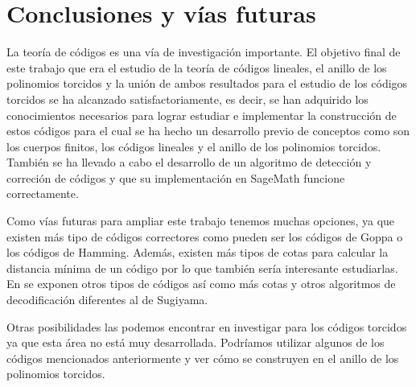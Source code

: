 


\chapter{Conclusiones y vías futuras}

La teoría de códigos es una vía de investigación importante. 
El objetivo final de este trabajo que era el estudio de la teoría de códigos lineales, el anillo de los polinomios torcidos y la unión de ambos resultados para el estudio de los códigos torcidos se ha alcanzado satisfactoriamente, es decir, se han adquirido los conocimientos necesarios para lograr estudiar e implementar la construcción de estos códigos para el cual se ha hecho un desarrollo previo de conceptos como son los cuerpos finitos, los códigos lineales y el anillo de los polinomios torcidos. También se ha llevado a cabo el desarrollo de un algoritmo de detección y correción de códigos y que su implementación en SageMath funcione correctamente.

Como vías futuras para ampliar este trabajo tenemos muchas opciones, ya que existen más tipo de códigos correctores como pueden ser los códigos de Goppa o los códigos de Hamming. Además, existen más tipos de cotas para calcular la distancia mínima de un código por lo que también sería interesante estudiarlas. En \cite{Huffman_Pless_2010} se exponen otros tipos de códigos así como más cotas y otros algoritmos de decodificación diferentes al de Sugiyama.

Otras posibilidades las podemos encontrar en investigar para los códigos torcidos ya que esta área no está muy desarrollada. Podríamos utilizar algunos de los códigos mencionados anteriormente y ver cómo se construyen en el anillo de los polinomios torcidos.





